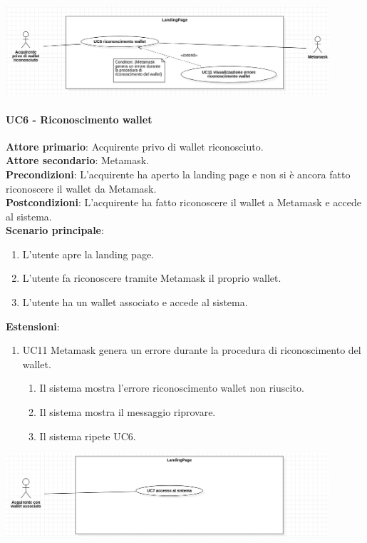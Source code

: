 \documentclass[a4paper, 12pt]{article}
\begin{document}
\includegraphics[width=0.9\textwidth]{UseCase_landing_page1}

\paragraph{UC6 - Riconoscimento wallet}
\textbf{Attore primario}: Acquirente privo di wallet riconosciuto.\\
\textbf{Attore secondario}: Metamask.\\
\textbf{Precondizioni}: L'acquirente ha aperto la landing page e non si è ancora fatto riconoscere il wallet da Metamask.\\
\textbf{Postcondizioni}: L'acquirente ha fatto riconoscere il wallet a Metamask e accede al sistema.\\
\textbf{Scenario principale}:
\begin{enumerate}
    \item L’utente apre la landing page.
    \item L’utente fa riconoscere tramite Metamask il proprio wallet.
    \item L’utente ha un wallet associato e accede al sistema.
\end{enumerate}
\textbf{Estensioni}:
\begin{enumerate}
    \item UC11 Metamask genera un errore durante la procedura di riconoscimento del wallet.
    \begin{enumerate}
        \item Il sistema mostra l'errore riconoscimento wallet non riuscito.
        \item Il sistema mostra il messaggio riprovare.
        \item Il sistema ripete UC6.
    \end{enumerate}
\end{enumerate}

\includegraphics[width=0.9\textwidth]{UseCase_landing_page2}
\end{document}
